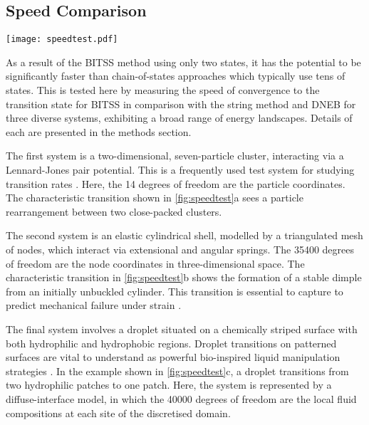 \documentclass[twocolumn,10pt]{revtex4-2}
\begin{document}
\subsection{Speed Comparison}
\begin{figure*}[tb]
  \texttt{[image: speedtest.pdf]}
  \caption{\label{fig:speedtest}
    Comparisons between BITSS, DNEB, and the string method in the convergence to the transition state as a function of the number of calculations of the energy gradient.
    Three test systems are used: (a) a Lennard-Jones seven-particle cluster, (b) cylindrical shell buckling, and (c) wetting of a chemically-striped surface.
    The configurations shown correspond to the two minimum energy states and the transition state, marked by an asterisk.
    The string method and DNEB are repeated with a differing number of images, as listed in the legend in (c).
  }
\end{figure*}

As a result of the BITSS method using only two states, it has the potential to be significantly faster than chain-of-states approaches which typically use tens of states.
This is tested here by measuring the speed of convergence to the transition state for BITSS in comparison with the string method and DNEB for three diverse systems, exhibiting a broad range of energy landscapes.
Details of each are presented in the methods section.

The first system is a two-dimensional, seven-particle cluster, interacting via a Lennard-Jones pair potential.
This is a frequently used test system for studying transition rates \cite{Wales2002,Passerone2001}.
Here, the \num{14} degrees of freedom are the particle coordinates.
The characteristic transition shown in \cref{fig:speedtest}a sees a particle rearrangement between two close-packed clusters.

The second system is an elastic cylindrical shell, modelled by a triangulated mesh of nodes, which interact via extensional and angular springs.
The \num{35400} degrees of freedom are the node coordinates in three-dimensional space.
The characteristic transition in \cref{fig:speedtest}b shows the formation of a stable dimple from an initially unbuckled cylinder.
This transition is essential to capture to predict mechanical failure under strain \cite{Panter2019,Virot2017}.

The final system involves a droplet situated on a chemically striped surface with both hydrophilic and hydrophobic regions.
Droplet transitions on patterned surfaces are vital to understand as powerful bio-inspired liquid manipulation strategies  \cite{Kusumaatmaja2006,Brown2016}.
In the example shown in \cref{fig:speedtest}c, a droplet transitions from two hydrophilic patches to one patch.
Here, the system is represented by a diffuse-interface model, in which the \num{40000} degrees of freedom are the local fluid compositions at each site of the discretised domain.
\end{document}
